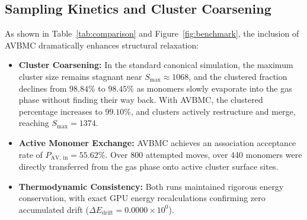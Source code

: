 \documentclass[11pt,a4paper]{article}
\begin{document}
\subsection{Sampling Kinetics and Cluster Coarsening}
As shown in Table~\ref{tab:comparison} and Figure~\ref{fig:benchmark}, the inclusion of AVBMC dramatically enhances structural relaxation:
\begin{itemize}
    \item \textbf{Cluster Coarsening:} In the standard canonical simulation, the maximum cluster size remains stagnant near $S_{\max} \approx 1068$, and the clustered fraction declines from $98.84\%$ to $98.45\%$ as monomers slowly evaporate into the gas phase without finding their way back. With AVBMC, the clustered percentage increases to $99.10\%$, and clusters actively restructure and merge, reaching $S_{\max} = 1374$.
    \item \textbf{Active Monomer Exchange:} AVBMC achieves an association acceptance rate of $P_{\text{AV, in}} = \mathbf{55.62\%}$. Over 800 attempted moves, over 440 monomers were directly transferred from the gas phase onto active cluster surface sites.
    \item \textbf{Thermodynamic Consistency:} Both runs maintained rigorous energy conservation, with exact GPU energy recalculations confirming zero accumulated drift ($\Delta E_{\text{drift}} = 0.0000 \times 10^0$).
\end{itemize}
\end{document}
